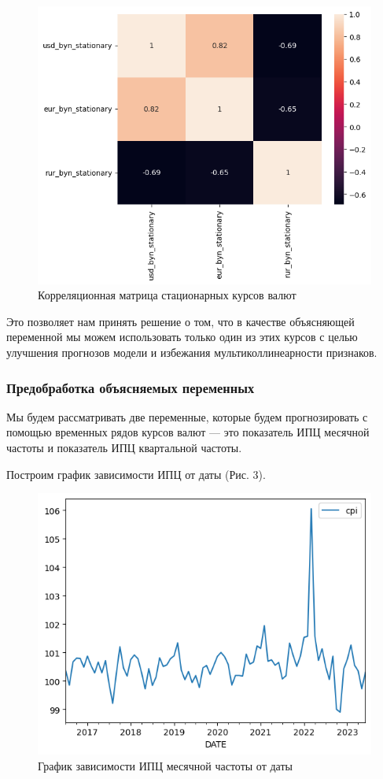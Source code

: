 \documentclass[a4paper, 14pt]{extarticle}
\begin{document}
	\begin{figure}[tph!]
		\centering
		\includegraphics[scale=0.8]{images/pic_02}
		\caption[Рис. 2]{Корреляционная матрица стационарных курсов валют}
		\label{fig:pic02}
	\end{figure}
	
	Это позволяет нам принять решение о том, что в качестве объясняющей переменной мы можем использовать только один из этих курсов с целью улучшения прогнозов модели и избежания мультиколлинеарности признаков.
	
	\subsubsection{Предобработка объясняемых переменных}
	
	Мы будем рассматривать две переменные, которые будем прогнозировать с помощью временных рядов курсов валют --- это показатель ИПЦ месячной частоты и показатель ИПЦ квартальной частоты.
	
	Построим график зависимости ИПЦ от даты (Рис. 3).
	\begin{figure}[bph!]
		\centering
		\includegraphics[scale=0.8]{images/pic_03}
		\caption[Рис. 3]{График зависимости ИПЦ месячной частоты от даты}
		\label{fig:pic03}
	\end{figure}
	
\end{document}
